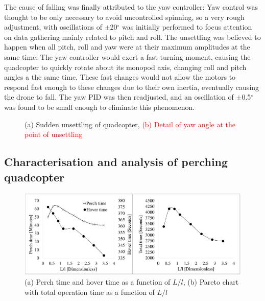 \documentclass[12pt,a4paper]{article}
\begin{document}
The cause of falling was finally attributed to the yaw controller: Yaw control was thought to be only necessary to avoid uncontrolled spinning, so a very rough adjustment, with oscillations of $\pm$20$^{\circ}$ was initially performed to focus attention on data gathering mainly related to pitch and roll. The unsettling was believed to happen when all pitch, roll and yaw were at their maximum amplitudes at the same time: The yaw controller would exert a fast turning moment, causing the quadcopter to quickly rotate about its monopod axis, changing roll and pitch angles a the same time. These fast changes would not allow the motors to respond fast enough to these changes due to their own inertia, eventually causing the drone to fall. The yaw PID was then readjusted, and an oscillation of $\pm$0.5$^{\circ}$ was found to be small enough to eliminate this phenomenon.


\begin{figure}[h!]
\centering
  \caption{(a) Sudden unsettling of quadcopter, \textcolor{red}{(b) Detail of yaw angle at the point of unsettling }}
  \label{fig9}
\end{figure}



\subsection{Characterisation and analysis of perching quadcopter}

\begin{figure}[h!]
\centering
 \includegraphics[scale=0.23]{Perch_Time.pdf}
  \caption{(a) Perch time and hover time as a function of $L/l$, (b) Pareto chart with total operation time as a function of $L/l$ }
  \label{fig10}
\end{figure}
\end{document}
